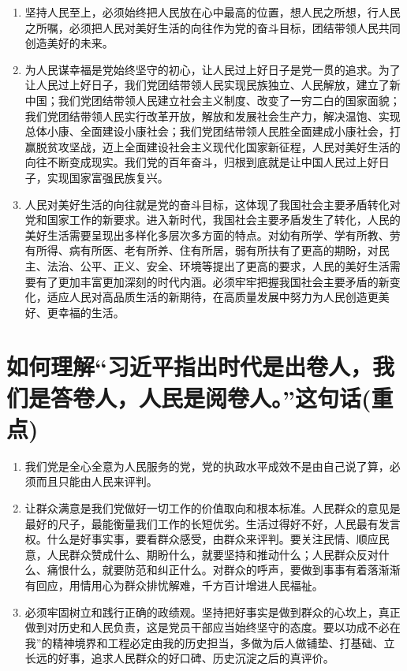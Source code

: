 \documentclass[12pt, a4paper, oneside]{ctexbook}
\begin{document}
\begin{enumerate}
\item 坚持人民至上，必须始终把人民放在心中最高的位置，想人民之所想，行人民之所嘱，必须把人民对美好生活的向往作为党的奋斗目标，团结带领人民共同创造美好的未来。

\item 为人民谋幸福是党始终坚守的初心，让人民过上好日子是党一贯的追求。为了让人民过上好日子，我们党团结带领人民实现民族独立、人民解放，建立了新中国；我们党团结带领人民建立社会主义制度、改变了一穷二白的国家面貌；我们党团结带领人民实行改革开放，解放和发展社会生产力，解决温饱、实现总体小康、全面建设小康社会；我们党团结带领人民胜全面建成小康社会，打赢脱贫攻坚战，迈上全面建设社会主义现代化国家新征程，人民对美好生活的向往不断变成现实。我们党的百年奋斗，归根到底就是让中国人民过上好日子，实现国家富强民族复兴。

\item 人民对美好生活的向往就是党的奋斗目标，这体现了我国社会主要矛盾转化对党和国家工作的新要求。进入新时代，我国社会主要矛盾发生了转化，人民的美好生活需要呈现出多样化多层次多方面的特点。对幼有所学、学有所教、劳有所得、病有所医、老有所养、住有所居，弱有所扶有了更高的期盼，对民主、法治、公平、正义、安全、环境等提出了更高的要求，人民的美好生活需要有了更加丰富更加深刻的时代内涵。必须牢牢把握我国社会主要矛盾的新变化，适应人民对高品质生活的新期待，在高质量发展中努力为人民创造更美好、更幸福的生活。
\end{enumerate}


\section{如何理解“习近平指出时代是出卷人，我们是答卷人，人民是阅卷人。”这句话(重点)}

\begin{enumerate}
\item 我们党是全心全意为人民服务的党，党的执政水平成效不是由自己说了算，必须而且只能由人民来评判。

\item 让群众满意是我们党做好一切工作的价值取向和根本标准。人民群众的意见是最好的尺子，最能衡量我们工作的长短优劣。生活过得好不好，人民最有发言权。什么是好事实事，要看群众感受，由群众来评判。要关注民情、顺应民意，人民群众赞成什么、期盼什么，就要坚持和推动什么；人民群众反对什么、痛恨什么，就要防范和纠正什么。对群众的呼声，要做到事事有着落渐渐有回应，用情用心为群众排忧解难，千方百计增进人民福祉。

\item 必须牢固树立和践行正确的政绩观。坚持把好事实是做到群众的心坎上，真正做到对历史和人民负责，这是党员干部应当始终坚守的态度。要以功成不必在我”的精神境界和工程必定由我的历史担当，多做为后人做铺垫、打基础、立长远的好事，追求人民群众的好口碑、历史沉淀之后的真评价。
\end{enumerate}
\end{document}
